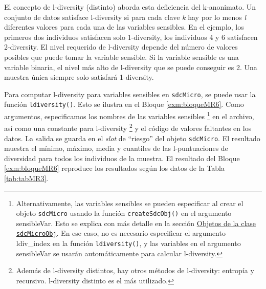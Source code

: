 \documentclass[]{book}
\theoremstyle{definition}
\theoremstyle{definition}
\theoremstyle{definition}
\theoremstyle{definition}
\theoremstyle{remark}
\begin{document}
El concepto de l-diversity (distinto) aborda esta deficiencia del k-anonimato. Un conjunto de datos satisface l-diversity si para cada clave \emph{k} hay por lo menos \emph{l} diferentes valores para cada una de las variables sensibles. En el ejemplo, los primeros dos individuos satisfacen solo 1-diversity, los individuos 4 y 6 satisfacen 2-diversity. El nivel requerido de l-diversity depende del número de valores posibles que puede tomar la variable sensible. Si la variable sensible es una variable binaria, el nivel más alto de l-diversity que se puede conseguir es 2. Una muestra única siempre solo satisfará 1-diversity.

Para computar l-diversity para variables sensibles en \texttt{sdcMicro}, se puede usar la función \texttt{ldiversity()}. Esto se ilustra en el Bloque \ref{exm:bloqueMR6}. Como argumentos, especificamos los nombres de las variables sensibles \footnote{Alternativamente, las variables sensibles se pueden especificar al crear el objeto \texttt{sdcMicro} usando la función \texttt{createSdcObj()} en el argumento sensibleVar. Esto se explica con más detalle en la sección \protect\hyperlink{objetos-de-la-clase-sdcmicroobj}{Objetos de la clase \texttt{sdcMicroObj}}. En ese caso, no es necesario especificar el argumento ldiv\_index en la función \texttt{ldiversity()}, y las variables en el argumento sensibleVar se usarán automáticamente para calcular l-diversity.} en el archivo, así como una constante para l-diversity \footnote{Además de l-diversity distintos, hay otros métodos de l-diversity: entropía y recursivo. l-diversity distinto es el más utilizado.} y el código de valores faltantes en los datos. La salida se guarda en el \emph{slot} de ``riesgo'' del objeto \texttt{sdcMicro}. El resultado muestra el mínimo, máximo, media y cuantiles de las l-puntuaciones de diversidad para todos los individuos de la muestra. El resultado del Bloque \ref{exm:bloqueMR6} reproduce los resultados según los datos de la Tabla \ref{tab:tabMR3}.
\end{document}
